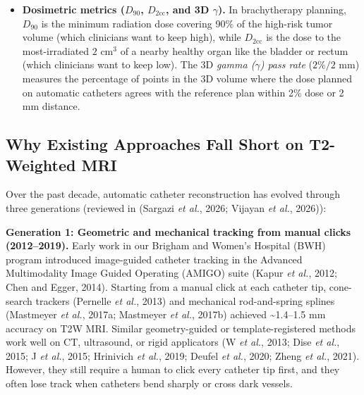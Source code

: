 \documentclass[
  11pt,
]{article}
\begin{document}
\begin{itemize}
  test our models on all 54 patients without ever testing on data used
  for training or tuning, we split the 54 patients into 5 outer groups
  (folds). In each round, 43 or 44 patients are used for training and
  tuning (via an internal 80/20 split or 5-fold inner cross-fitting),
  and the remaining 10 or 11 patients are held in a locked vault and
  evaluated \emph{once}. Every patient is thus evaluated strictly
  ``out-of-fold'' (as an unseen patient).
\item
  \textbf{Dosimetric metrics (\(D_{90}\), \(D_{2\text{cc}}\), and 3D
  \(\gamma\)).} In brachytherapy planning, \(D_{90}\) is the minimum
  radiation dose covering 90\% of the high-risk tumor volume (which
  clinicians want to keep high), while \(D_{2\text{cc}}\) is the dose to
  the most-irradiated \(2\text{ cm}^3\) of a nearby healthy organ like
  the bladder or rectum (which clinicians want to keep low). The 3D
  \emph{gamma (\(\gamma\)) pass rate} (\(2\%/2\text{ mm}\)) measures the
  percentage of points in the 3D volume where the dose planned on
  automatic catheters agrees with the reference plan within 2\% dose or
  2 mm distance.
\end{itemize}

\subsection{Why Existing Approaches Fall Short on T2-Weighted
MRI}\label{why-existing-approaches-fall-short-on-t2-weighted-mri}

Over the past decade, automatic catheter reconstruction has evolved
through three generations (reviewed in (Sargazi \emph{et al.}, 2026;
Vijayan \emph{et al.}, 2026)):

\textbf{Generation 1: Geometric and mechanical tracking from manual
clicks (2012--2019).} Early work in our Brigham and Women's Hospital
(BWH) program introduced image-guided catheter tracking in the Advanced
Multimodality Image Guided Operating (AMIGO) suite (Kapur \emph{et al.},
2012; Chen and Egger, 2014). Starting from a manual click at each
catheter tip, cone-search trackers (Pernelle \emph{et al.}, 2013) and
mechanical rod-and-spring splines (Mastmeyer \emph{et al.}, 2017a;
Mastmeyer \emph{et al.}, 2017b) achieved \textasciitilde1.4--1.5 mm
accuracy on T2W MRI. Similar geometry-guided or template-registered
methods work well on CT, ultrasound, or rigid applicators (W \emph{et
al.}, 2013; Dise \emph{et al.}, 2015; J \emph{et al.}, 2015; Hrinivich
\emph{et al.}, 2019; Deufel \emph{et al.}, 2020; Zheng \emph{et al.},
2021). However, they still require a human to click every catheter tip
first, and they often lose track when catheters bend sharply or cross
dark vessels.
\end{document}
